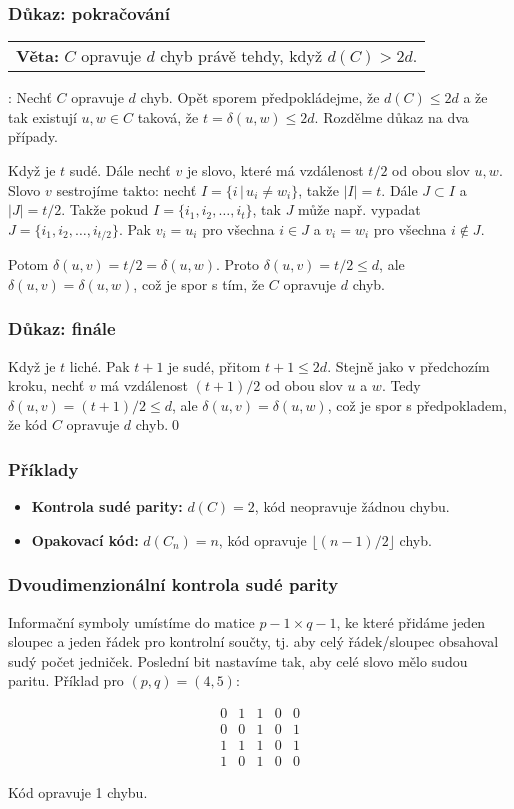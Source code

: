 \documentclass{beamer}
\newenvironment{veta}
{
    \begin{center}
    \begin{tabular}{p{9cm}}
    \textbf{Věta:}
}
{
    \end{tabular}
    \end{center}
}
\newcommand{\sep}{\,|\,}
\newenvironment{itemizex}%
  {\large \begin{itemize}%
    \setlength{\itemsep}{8pt}%
    \setlength{\parskip}{8pt}}%
  {\end{itemize}}
\begin{document}
\begin{frame}[t,fragile]\frametitle{Důkaz: pokračování} 
\begin{veta}$C$ opravuje $d$ chyb právě tehdy, když $d(C)>2d$.\end{veta}
\uv{$\Rightarrow$}: Nechť $C$ opravuje $d$ chyb. Opět sporem předpokládejme, že $d(C)\le 2d$ a že tak existují $u,w\in C$ taková, že $t=\delta(u,w)\le2d$. Rozdělme důkaz na dva případy.

Když je $t$ sudé. Dále nechť $v$ je slovo, které má vzdálenost $t/2$ od obou slov $u, w$. Slovo $v$ sestrojíme takto: nechť $I=\{i\sep u_i\ne w_i\}$, takže $|I|=t$. Dále $J\subset I$ a $|J|=t/2$. Takže pokud $I=\{i_1, i_2, \dots, i_t\}$, tak $J$ může např. vypadat $J=\{i_1, i_2, \dots, i_{t/2}\}$. Pak $v_i=u_i$ pro všechna $i\in J$ a $v_i=w_i$ pro všechna $i\notin J$.

Potom $\delta(u,v)=t/2=\delta(u,w)$. Proto $\delta(u,v)=t/2\le d$, ale $\delta(u,v)=\delta(u,w)$, což je spor s tím, že $C$ opravuje $d$ chyb. 
\end{frame}


\begin{frame}[t,fragile]\frametitle{Důkaz: finále} 
Když je $t$ liché. Pak $t+1$ je sudé, přitom $t+1\le2d$. Stejně jako v předchozím kroku, nechť $v$ má vzdálenost $(t+1)/2$ od obou slov $u$ a $w$. Tedy $\delta(u,v)=(t+1)/2\le d$, ale $\delta(u,v)=\delta(u,w)$, což je spor s předpokladem, že kód $C$ opravuje $d$ chyb.\qed
\end{frame}


\begin{frame}[t,fragile]\frametitle{Příklady} 
    \begin{itemizex}
        \item \textbf{Kontrola sudé parity:} $d(C)=2$, kód neopravuje žádnou chybu.
        \item \textbf{Opakovací kód:} $d(C_n)=n$, kód opravuje $\lfloor(n-1)/2\rfloor$ chyb. 
    \end{itemizex}


\end{frame}



\begin{frame}[t,fragile]\frametitle{Dvoudimenzionální kontrola sudé parity} 
Informační symboly umístíme do matice $p-1\times q-1$, ke které přidáme jeden sloupec a jeden řádek pro kontrolní součty, tj. aby celý řádek/sloupec obsahoval sudý počet jedniček. Poslední bit nastavíme tak, aby celé slovo mělo sudou paritu. Příklad pro $(p,q)=(4,5)$:

$$
\begin{array}{cccc|c}
0&1&1&0&0\\
0&0&1&0&1\\
1&1&1&0&1\\\hline
1&0&1&0&0
\end{array}
$$

Kód opravuje 1 chybu. 
\end{frame}
\end{document}
